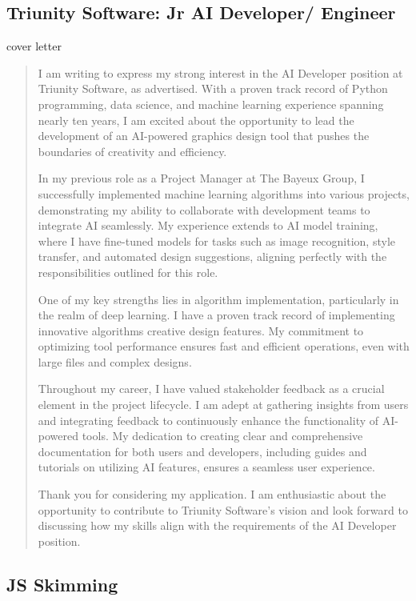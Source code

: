 \documentclass[
	letterpaper, %
	12pt, %
]{CSSullivanBusinessReport}
\begin{document}

\subsection[Triunity Software]{Triunity Software: Jr AI Developer/ Engineer}

cover letter

\begin{quote}
	I am writing to express my strong interest in the AI Developer position at Triunity Software, as advertised. With a proven track record of Python programming, data science, and machine learning experience spanning nearly ten years, I am excited about the opportunity to lead the development of an AI-powered graphics design tool that pushes the boundaries of creativity and efficiency.

	In my previous role as a Project Manager at The Bayeux Group, I successfully implemented machine learning algorithms into various projects, demonstrating my ability to collaborate with development teams to integrate AI seamlessly. My experience extends to AI model training, where I have fine-tuned models for tasks such as image recognition, style transfer, and automated design suggestions, aligning perfectly with the responsibilities outlined for this role.

	One of my key strengths lies in algorithm implementation, particularly in the realm of deep learning. I have a proven track record of implementing innovative algorithms creative design features. My commitment to optimizing tool performance ensures fast and efficient operations, even with large files and complex designs.

	Throughout my career, I have valued stakeholder feedback as a crucial element in the project lifecycle. I am adept at gathering insights from users and integrating feedback to continuously enhance the functionality of AI-powered tools. My dedication to creating clear and comprehensive documentation for both users and developers, including guides and tutorials on utilizing AI features, ensures a seamless user experience.

	Thank you for considering my application. I am enthusiastic about the opportunity to contribute to Triunity Software's vision and look forward to discussing how my skills align with the requirements of the AI Developer position.
\end{quote}


\subsection[JS Skimming]{JS Skimming}
\end{document}
